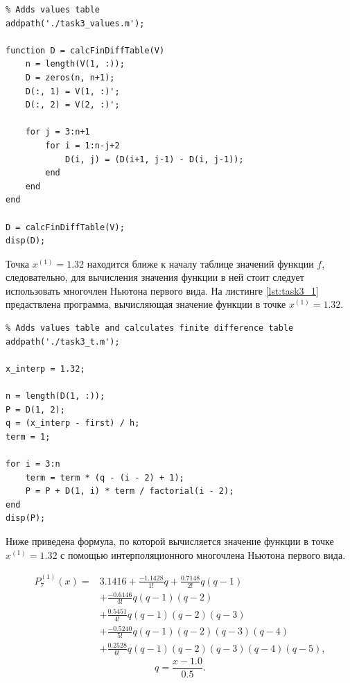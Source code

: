\begin{listing}[H]
\caption{Вычисление таблицы конечных разностей на основе таблицы значений для функции $f(x) = \arccos(\log_2(\frac{x}{2}))$}
\vspace{-20pt}
\label{lst:task3_t}
\begin{verbatim}
% Adds values table
addpath('./task3_values.m');

function D = calcFinDiffTable(V)
    n = length(V(1, :));
    D = zeros(n, n+1);
    D(:, 1) = V(1, :)';
    D(:, 2) = V(2, :)';

    for j = 3:n+1
        for i = 1:n-j+2
            D(i, j) = (D(i+1, j-1) - D(i, j-1));
        end
    end
end

D = calcFinDiffTable(V);
disp(D);
\end{verbatim}
\end{listing}

Точка $x^{(1)} = 1.32$ находится ближе к началу таблице значений функции $f$, следовательно, для вычисления значения функции в ней стоит следует использовать многочлен Ньютона первого вида. На листинге \ref{lst:task3_1} предаствлена программа, вычисляющая значение функции в точке $x^{(1)} = 1.32$.

\begin{listing}[H]
\caption{Вычисление значения функции $f$ в точке $x^{(1)} = 1.32$ с помощью интерполяционного многочлена Ньютона первого вида}
\vspace{-20pt}
\label{lst:task3_1}
\begin{verbatim}
% Adds values table and calculates finite difference table
addpath('./task3_t.m');

x_interp = 1.32;

n = length(D(1, :));
P = D(1, 2);
q = (x_interp - first) / h;
term = 1;

for i = 3:n
    term = term * (q - (i - 2) + 1);
    P = P + D(1, i) * term / factorial(i - 2);
end
disp(P);
\end{verbatim}
\end{listing}

Ниже приведена формула, по которой вычисляется значение функции в точке $x^{(1)} = 1.32$ с помощью интерполяционного многочлена Ньютона первого вида.

\[
\begin{aligned}
P_7^{(1)}(x)={}&
3.1416
+\frac{-1.1428}{1!}q
+\frac{0.7148}{2!}q(q-1)\\
&+\frac{-0.6146}{3!}q(q-1)(q-2)\\
&+\frac{0.5451}{4!}q(q-1)(q-2)(q-3)\\
&+\frac{-0.5240}{5!}q(q-1)(q-2)(q-3)(q-4)\\
&+\frac{0.2528}{6!}q(q-1)(q-2)(q-3)(q-4)(q-5),
\end{aligned}
\]
\[
q=\frac{x-1.0}{0.5}.
\]

